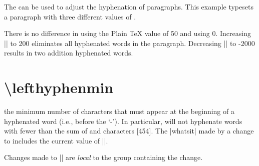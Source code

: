 \begin{texexample}{}{}
\end{texexample}



The  can be used to adjust the hyphenation of paragraphs. 
This example typesets a paragraph with three different values of . 

There is no difference in using the Plain TeX value of 50 and using 0. 
Increasing |\hyphenpenalty| to 200 eliminates all hyphenated words in the paragraph. 
Decreasing |\hyphenpenalty|  to -2000 results in two addition hyphenated words.






\section*{\textbackslash lefthyphenmin}
 the minimum number of characters that must appear at the beginning of a hyphenated word (i.e., before the `-'). In particular, \tex will not hyphenate words with fewer than the sum of  and  characters [454]. The |whatsit|  made by a change to  includes the current value of |\lefthyphenmin|.

Changes made to |\lefthyphenmin| are \textit{local} to the group containing the change.


